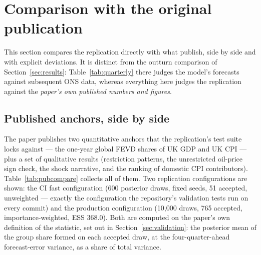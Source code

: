 \section{Comparison with the original publication}
\label{sec:comparison}

This section compares the replication directly with what \citet{brignone2025} publish, side by side and with explicit deviations. It is distinct from the outturn comparison of Section~\ref{sec:results}: Table~\ref{tab:quarterly} there judges the model's forecasts against subsequent ONS data, whereas everything here judges the replication against the \emph{paper's own published numbers and figures}.

\subsection{Published anchors, side by side}
\label{sec:comparison-table}

The paper publishes two quantitative anchors that the replication's test suite locks against --- the one-year global FEVD shares of UK GDP and UK CPI --- plus a set of qualitative results (restriction patterns, the unrestricted oil-price sign check, the shock narrative, and the ranking of domestic CPI contributors). Table~\ref{tab:pubcompare} collects all of them. Two replication configurations are shown: the CI fast configuration (600 posterior draws, fixed seeds, 51 accepted, unweighted --- exactly the configuration the repository's validation tests run on every commit) and the production configuration (10{,}000 draws, 765 accepted, importance-weighted, ESS 368.0). Both are computed on the paper's own definition of the statistic, set out in Section~\ref{sec:validation}: the posterior mean of the group share formed on each accepted draw, at the four-quarter-ahead forecast-error variance, as a share of total variance.

